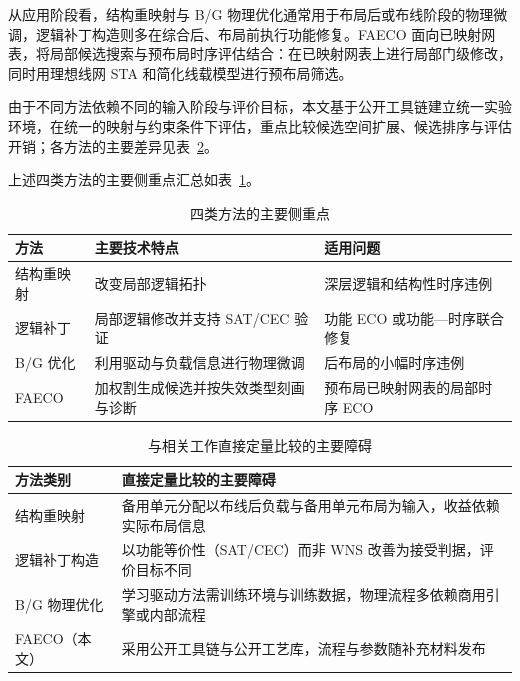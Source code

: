 \documentclass[twocolumn,10pt,fontset=windows]{ctexart}
\begin{document}
从应用阶段看，结构重映射与 B/G 物理优化通常用于布局后或布线阶段的物理微调，逻辑补丁构造则多在综合后、布局前执行功能修复。FAECO 面向已映射网表，将局部候选搜索与预布局时序评估结合：在已映射网表上进行局部门级修改，同时用理想线网 STA 和简化线载模型进行预布局筛选。

由于不同方法依赖不同的输入阶段与评价目标，本文基于公开工具链建立统一实验环境，在统一的映射与约束条件下评估，重点比较候选空间扩展、候选排序与评估开销；各方法的主要差异见表~\ref{tab:baseline_cmp}。

上述四类方法的主要侧重点汇总如表~\ref{tab:related_diff}。

\begin{table}[H]
\centering
\caption{四类方法的主要侧重点}
\label{tab:related_diff}
\footnotesize
\setlength{\tabcolsep}{2pt}
\begin{tabular}{>{\raggedright\arraybackslash}p{1.55cm}>{\raggedright\arraybackslash}p{2.55cm}>{\raggedright\arraybackslash}p{3.2cm}}
\toprule
\textbf{方法} & \textbf{主要技术特点} & \textbf{适用问题} \\
\midrule
结构重映射 & 改变局部逻辑拓扑 & 深层逻辑和结构性时序违例 \\
逻辑补丁 & 局部逻辑修改并支持 SAT/CEC 验证 & 功能 ECO 或功能—时序联合修复 \\
B/G 优化 & 利用驱动与负载信息进行物理微调 & 后布局的小幅时序违例 \\
FAECO & 加权割生成候选并按失效类型刻画与诊断 & 预布局已映射网表的局部时序 ECO \\
\bottomrule
\end{tabular}
\end{table}

\begin{table}[ht]
\centering
\caption{与相关工作直接定量比较的主要障碍}
\label{tab:baseline_cmp}
\footnotesize
\setlength{\tabcolsep}{3pt}
\begin{tabular}{>{\raggedright\arraybackslash}p{2.3cm}>{\raggedright\arraybackslash}p{5.0cm}}
\toprule
\textbf{方法类别} & \textbf{直接定量比较的主要障碍} \\
\midrule
结构重映射 & 备用单元分配以布线后负载与备用单元布局为输入，收益依赖实际布局信息 \\
逻辑补丁构造 & 以功能等价性（SAT/CEC）而非 WNS 改善为接受判据，评价目标不同 \\
B/G 物理优化 & 学习驱动方法需训练环境与训练数据，物理流程多依赖商用引擎或内部流程 \\
FAECO（本文） & 采用公开工具链与公开工艺库，流程与参数随补充材料发布 \\
\bottomrule
\end{tabular}
\end{table}
\end{document}
